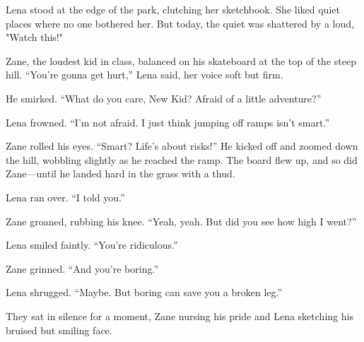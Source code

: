 \documentclass[12pt]{article}
\begin{document}
\begin{tcolorbox}[colframe=black!60, colback=white, 
coltitle=black, colbacktitle=black!15, fonttitle=\bfseries\Large, 
title=Text: The New Kid and the Daredevil, halign title=center, left=10pt, right=10pt, top=10pt, bottom=15pt]


Lena stood at the edge of the park, clutching her sketchbook. She liked quiet places where no one bothered her. But today, the quiet was shattered by a loud, "Watch this!"

Zane, the loudest kid in class, balanced on his skateboard at the top of the steep hill. “You’re gonna get hurt,” Lena said, her voice soft but firm.

He smirked. “What do you care, New Kid? Afraid of a little adventure?”

Lena frowned. “I’m not afraid. I just think jumping off ramps isn’t smart.”

Zane rolled his eyes. “Smart? Life’s about risks!” He kicked off and zoomed down the hill, wobbling slightly as he reached the ramp. The board flew up, and so did Zane—until he landed hard in the grass with a thud.

Lena ran over. “I told you.”

Zane groaned, rubbing his knee. “Yeah, yeah. But did you see how high I went?”

Lena smiled faintly. “You’re ridiculous.”

Zane grinned. “And you’re boring.”

Lena shrugged. “Maybe. But boring can save you a broken leg.”

They sat in silence for a moment, Zane nursing his pride and Lena sketching his bruised but smiling face.

 


 
\end{tcolorbox}

\vspace{1em}
\end{document}
